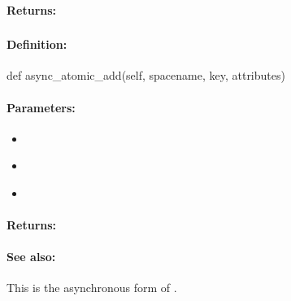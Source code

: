 \paragraph{Returns:}


\pagebreak
\subsubsection{}
\label{api:python:async_atomic_add}


\paragraph{Definition:}
\begin{pythoncode}
def async_atomic_add(self, spacename, key, attributes)
\end{pythoncode}

\paragraph{Parameters:}
\begin{itemize}[noitemsep]
\item {}\\

\item {}\\

\item {}\\

\end{itemize}

\paragraph{Returns:}


\paragraph{See also:}  This is the asynchronous form of .

\pagebreak
\subsubsection{}
\label{api:python:cond_atomic_add}


